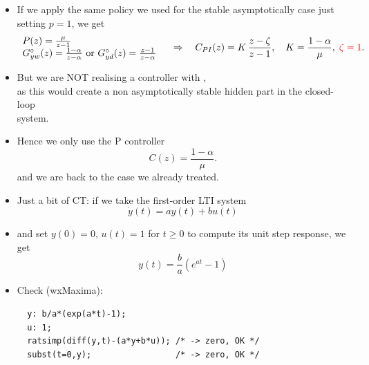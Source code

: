 \begin{frame}
\myPause
 \begin{itemize}[<+-| alert@+>]
 \item If we apply the same policy we used for the stable asymptotically case just setting $p=1$, we get
       \begin{displaymath}
        \begin{array}{l}
          P(z)              = \frac{\mu}{z-1} \\
          G_{yw}^{\circ}(z) = \frac{1-\alpha}{z-\alpha}
          \text{ or }
          G_{yd}^{\circ}(z) = \frac{z-1}{z-\alpha}       
        \end{array}
        \quad \Rightarrow \quad
        C_{PI}(z)  = K\,\frac{z-\zeta}{z-1}, \quad
        K          = \frac{1-\alpha}{\mu}, \;
        \textcolor{red}{\zeta = 1}.
       \end{displaymath}
 \item But we are NOT realising a controller with ,\\
       as this would create a non asymptotically stable hidden part in the closed-loop\\
       system.
\item Hence we only use the P controller
       \begin{displaymath}
        C(z) = \frac{1-\alpha}{\mu}.
       \end{displaymath}
      and we are back to the case we already treated.
 \end{itemize}
\end{frame}

\begin{frame}[fragile]
\myPause
 \begin{itemize}[<+-| alert@+>]
 \item Just a bit of CT: if we take the first-order LTI system
       \begin{displaymath}
        \dot{y}(t) = ay(t)+bu(t)
       \end{displaymath}
 \item and set $y(0)=0$, $u(t)=1$ for $t \geq 0$ to compute its unit step response, we get
       \begin{displaymath}
        y(t) = \frac{b}{a} \left( e^{at}-1 \right)
       \end{displaymath}
 \item Check (wxMaxima):
       \begin{verbatim}
  y: b/a*(exp(a*t)-1);
  u: 1;
  ratsimp(diff(y,t)-(a*y+b*u)); /* -> zero, OK */
  subst(t=0,y);                 /* -> zero, OK */
       \end{verbatim}
 \end{itemize}
\end{frame}

